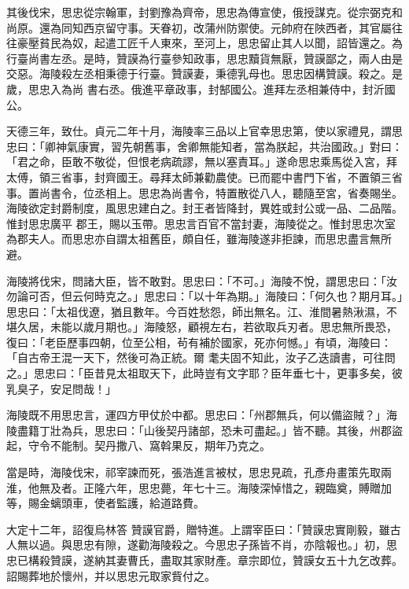 \begin{pinyinscope}
 其後伐宋，思忠從宗翰軍，封劉豫為齊帝，思忠為傳宣使，俄授謀克。從宗弼克和尚原。還為同知西京留守事。天眷初，改蒲州防禦使。元帥府在陜西者，其官屬往往豪壓貧民為奴，起遣工匠千人東來，至河上，思忠留止其人以聞，詔皆還之。為行臺尚書左丞。是時，贊謨為行臺參知政事，思忠黷貨無厭，贊謨鄙之，兩人由是交惡。海陵殺左丞相秉德于行臺。贊謨妻，秉德乳母也。思忠因構贊謨。殺之。是歲，思忠入為尚
 書右丞。俄進平章政事，封郜國公。進拜左丞相兼侍中，封沂國公。



 天德三年，致仕。貞元二年十月，海陵率三品以上官幸思忠第，使以家禮見，謂思忠曰：「卿神氣康實，習先朝舊事，舍卿無能知者，當為朕起，共治國政。」對曰：「君之命，臣敢不敬從，但恨老病疏謬，無以塞責耳。」遂命思忠乘馬從入宮，拜太傅，領三省事，封齊國王。尋拜太師兼勸農使。已而罷中書門下省，不置領三省事。置尚書令，位丞相上。思忠為尚書令，特置散從八人，聽隨至宮，省奏賜坐。海陵欲定封爵制度，風思忠建白之。封王者皆降封，異姓或封公或一品、二品階。惟封思忠廣平
 郡王，賜以玉帶。思忠言百官不當封妻，海陵從之。惟封思忠次室為郡夫人。而思忠亦自謂太祖舊臣，頗自任，雖海陵遂非拒諫，而思忠盡言無所避。



 海陵將伐宋，問諸大臣，皆不敢對。思忠曰：「不可。」海陵不悅，謂思忠曰：「汝勿論可否，但云何時克之。」思忠曰：「以十年為期。」海陵曰：「何久也？期月耳。」思忠曰：「太祖伐遼，猶且數年。今百姓愁怨，師出無名。江、淮間暑熱湫濕，不堪久居，未能以歲月期也。」海陵怒，顧視左右，若欲取兵刃者。思忠無所畏恐，復曰：「老臣歷事四朝，位至公相，茍有補於國家，死亦何憾。」有頃，海陵曰：「自古帝王混一天下，然後可為正統。爾
 耄夫固不知此，汝子乙迭讀書，可往問之。」思忠曰：「臣昔見太祖取天下，此時豈有文字耶？臣年垂七十，更事多矣，彼乳臭子，安足問哉！」



 海陵既不用思忠言，運四方甲仗於中都。思忠曰：「州郡無兵，何以備盜賊？」海陵盡籍丁壯為兵，思忠曰：「山後契丹諸部，恐未可盡起。」皆不聽。其後，州郡盜起，守令不能制。契丹撒八、窩斡果反，期年乃克之。



 當是時，海陵伐宋，祁宰諫而死，張浩進言被杖，思忠見疏，孔彥舟畫策先取兩淮，他無及者。正隆六年，思忠薨，年七十三。海陵深悼惜之，親臨奠，賻贈加等，賜金螭頭車，使者監護，給道路費。



 大定十二年，詔復烏林答
 贊謨官爵，贈特進。上謂宰臣曰：「贊謨忠實剛毅，雖古人無以過。與思忠有隙，遂勸海陵殺之。今思忠子孫皆不肖，亦陰報也。」初，思忠已構殺贊謨，遂納其妻曹氏，盡取其家財產。章宗即位，贊謨女五十九乞改葬。詔賜葬地於懷州，并以思忠元取家貲付之。




\end{pinyinscope}
